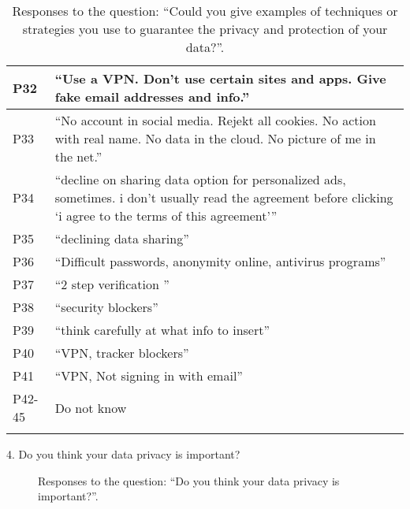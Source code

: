 \begin{longtable}{p{3cm} p{13cm}}
    \hline
    P32 & ``Use a VPN. Don't use certain sites and apps. Give fake email addresses and info.'' \\
    \hline
    P33 & ``No account in social media. Rejekt all cookies. No action with real name. No data in the cloud. No picture of me in the net.'' \\
    \hline
    P34 & ``decline on sharing data option for personalized ads, sometimes. i don't usually read the agreement before clicking `i agree to the terms of this agreement''' \\
    \hline
    P35 & ``declining data sharing'' \\
    \hline
    P36 & ``Difficult passwords, anonymity online, antivirus programs'' \\
    \hline
    P37 & ``2 step verification '' \\
    \hline
    P38 & ``security blockers'' \\
    \hline
    P39 & ``think carefully at what info to insert'' \\
    \hline
    P40 & ``VPN, tracker blockers'' \\
    \hline
    P41 & ``VPN, Not signing in with email'' \\
    \hline
    P42-45 & Do not know \\
    \hline
    \caption*{Responses to the question: ``Could you give examples of techniques or strategies you use to guarantee the privacy and protection of your data?''.}
    \label{table:survey_s1_q3}
\end{longtable}

\clearpage

4. Do you think your data privacy is important?

\begin{figure}[H]
    \begin{center}
        \caption*{Responses to the question: ``Do you think your data privacy is important?''.}
        \label{fig:survey_s1_q4}
    \end{center}
\end{figure}

